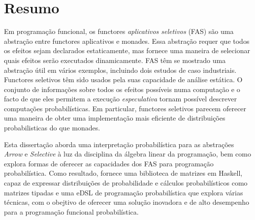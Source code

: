 \documentclass[
  oneside,
  11pt, a4paper,
  footinclude=true,
  headinclude=true,
  cleardoublepage=empty
]{scrbook}
\theoremstyle{definition}
\theoremstyle{definition}
\begin{document}
	\cleardoublepage
	\chapter*{Resumo}
	
    
    Em programação funcional, os functores \emph{aplicativos seletivos} (FAS) são uma abstração entre functores aplicativos e monades. Essa abstração requer que todos os efeitos sejam declarados estaticamente, mas fornece uma maneira de selecionar quais efeitos serão executados dinamicamente. FAS têm se mostrado uma abstração útil em vários exemplos, incluindo dois estudos de caso industriais. Functores seletivos têm sido usados ​​pela suas capacidade de análise estática. O conjunto de informações sobre todos os efeitos possíveis numa computação e o facto de que eles permitem a execução \emph{especulativa} tornam possível descrever computações probabilísticas. Em particular, functores seletivos parecem oferecer uma maneira de obter uma implementação mais eficiente de distribuições probabilisticas do que monades.
        
    Esta dissertação aborda uma interpretação probabilística para as abstrações \emph{Arrow} e \emph{Selective} à luz da disciplina da álgebra linear da programação, bem como explora formas de oferecer as capacidades dos FAS para programação probabilística. Como resultado, fornece uma biblioteca de matrizes em Haskell, capaz de expressar distribuições de probabilidade e cálculos probabilísticos como matrizes tipadas e uma eDSL de programação probabilística que explora várias técnicas, com o obejtivo de oferecer uma solução inovadora e de alto desempenho para a programação funcional probabilística.
	
	\vskip0.5cm
    
	\tableofcontents
	\listoffigures
	\listoftables
	\lstlistoflistings
    \renewcommand{\listtheoremname}{List of theorems and definitions}
	\printglossary[type=\acronymtype]
	\clearpage
	\thispagestyle{empty}

	
\end{document}
